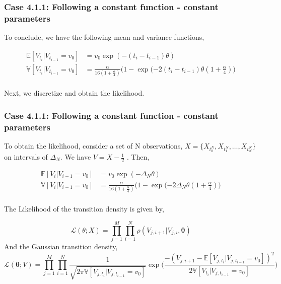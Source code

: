\documentclass[aspectratio=169]{beamer}\usepackage[utf8]{inputenc}
\newcommand{\E}{\mathbb{E}}
\newcommand{\V}{\mathbb{V}}
\begin{document}
\begin{frame}\frametitle{ Case 4.1.1: Following a constant function - constant parameters }

To conclude, we have the following mean and variance functions,

\begin{equation}
\begin{split}
\E[V_{t_i}| V_{t_{i-1}}=v_0] &= v_0 \exp ( -(t_i - t_{i-1})\theta ) \\
 \V[V_{t_i}| V_{t_{i-1}}=v_0] &= \frac{\alpha }{16 (1+ \frac{\alpha}{4})} \Big(1- \exp ( -2 (t_i - t_{i-1}) \theta (1 + \frac{\alpha }{4} ) \Big) \\
\end{split}
\end{equation}

Next, we discretize  and obtain the likelihood.
\end{frame}


\begin{frame}\frametitle{ Case 4.1.1: Following a constant function - constant parameters }
To obtain the likelihood, consider a set of N observations, $X= \{ X_{t_0^N} , X_{t_1^N} ,\ldots , X_{t_N^N} \}$ on intervals of $\Delta_N$. We have $V=X-\frac{1}{2}$ .  Then,

\begin{equation}
\begin{split}
\E[V_{i}| V_{i-1}=v_0] &= v_0 \exp ( -\Delta_N \theta )  \\
 \V[V_{i}| V_{i-1}=v_0] &= \frac{\alpha }{16 (1+ \frac{\alpha}{4})} \Big(1- \exp ( -2 \Delta_N\theta (1 + \frac{\alpha }{4} ) \Big)\\
\end{split}
\end{equation}

The Likelihood  of the transition density is given by,

\begin{equation}
\mathcal{L}(\theta;X) = \prod\limits_{j=1}^M\prod\limits_{i=1}^N\rho( {V_{j,i+1}|V_{j,i}}, \bm{\theta}) 
\end{equation}
And the Gaussian transition density,
\begin{equation*}
\mathcal{L}(\bm{\theta}; V) = \prod\limits_{j=1}^M \prod\limits_{i=1}^N  \frac{1}{\sqrt{2 \pi \V[V_{j,t_i}| V_{j,t_{i-1}}=v_0] }  } \exp\Big(\frac{-(V_{j,i+1}   - \E[V_{j,t_i}| V_{j,t_{i-1}}=v_0] )^2}{2\V[V_{t_i}| V_{j,t_{i-1}}=v_0]}\Big) 
\end{equation*}

\end{frame}
\end{document}
